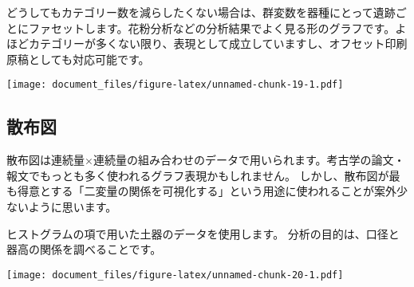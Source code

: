 \documentclass[]{article}
\newenvironment{Shaded}{\begin{snugshade}}{\end{snugshade}}
\newcommand{\DataTypeTok}[1]{\textcolor[rgb]{0.13,0.29,0.53}{#1}}
\newcommand{\KeywordTok}[1]{\textcolor[rgb]{0.13,0.29,0.53}{\textbf{#1}}}
\newcommand{\NormalTok}[1]{#1}
\newcommand{\OperatorTok}[1]{\textcolor[rgb]{0.81,0.36,0.00}{\textbf{#1}}}
\newcommand{\StringTok}[1]{\textcolor[rgb]{0.31,0.60,0.02}{#1}}
\begin{document}
どうしてもカテゴリー数を減らしたくない場合は、群変数を器種にとって遺跡ごとにファセットします。花粉分析などの分析結果でよく見る形のグラフです。よほどカテゴリーが多くない限り、表現として成立していますし、オフセット印刷原稿としても対応可能です。

\begin{Shaded}
\end{Shaded}

\texttt{[image: document\_files/figure-latex/unnamed-chunk-19-1.pdf]}

\subsection{散布図}

散布図は連続量×連続量の組み合わせのデータで用いられます。考古学の論文・報文でもっとも多く使われるグラフ表現かもしれません。
しかし、散布図が最も得意とする「二変量の関係を可視化する」という用途に使われることが案外少ないように思います。

ヒストグラムの項で用いた土器のデータを使用します。
分析の目的は、口径と器高の関係を調べることです。

\begin{Shaded}
\end{Shaded}

\texttt{[image: document\_files/figure-latex/unnamed-chunk-20-1.pdf]}
\end{document}
